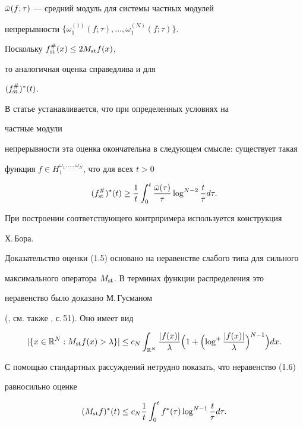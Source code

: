 $\Bar\omega(f;\tau)$ --- средний модуль для системы частных модулей 


непрерывности $\{\omega_1^{(1)}(f;\tau),\dotsc,\omega_1^{(N)}(f;\tau)\}$. 


Поскольку $f_{\operatorname{st}}^\#(x)\le 2M_{\operatorname{st}} f(x)$,


то аналогичная оценка справедлива и для 


$(f_{\operatorname{st}}^\#)^*(t)$. 


В статье устанавливается, что при определенных условиях на 


частные модули 


непрерывности эта оценка окончательна в следующем смысле: существует такая 


функция $f\in H_1^{\omega_1,\dotsc,\omega_N}$, что для всех $t>0$ 


$$ 


(f_{\st}^\#)^*(t)\ge \frac{1}{t}\int^t_0\frac{\Bar\omega(\tau)}{\tau} 


\log^{N-2}


\frac{t}{\tau}d\tau. 


$$ 


При построении соответствующего контрпримера используется конструкция 


Х.\,Бора. 


 


Доказательство оценки (1.5) основано на неравенстве слабого типа для сильного 


максимального оператора $M_{\operatorname{st}}$. В терминах функции распределения это 


неравенство было доказано М.\,Гусманом 


(\cite{Guz1}, см. также \cite{Guz2}, с.\,51). Оно имеет вид 


\begin{equation} 


|\{x\in\Bbb R^N:M_{\st} f(x)>\lambda\}| \le c_N\int_{\Bbb R^N} 


\frac{|f(x)|}{\lambda}\Bigl(1+\Bigl(\log^+ 


\frac{|f(x)|}{\lambda}\Bigr)^{N-1}\Bigr) dx. 


\end{equation} 


С помощью стандартных рассуждений нетрудно показать, что неравенство (1.6) 


равносильно оценке


\begin{equation} 


(M_{\st} f)^*(t)\le c_N\frac{1}{t}\int^t_0 f^*(\tau)\log^{N-1} 


\frac{t}{\tau}d\tau. 


\end{equation} 


